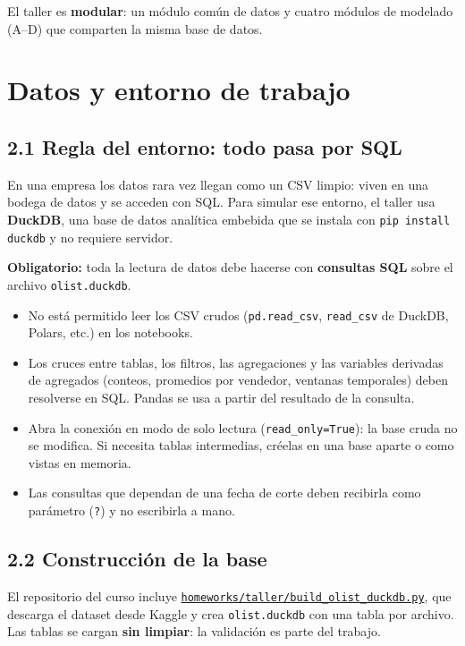 \documentclass[11pt,letterpaper]{article}
\newcommand{\buildscript}{https://github.com/anvasquezre/EAFIT_AA_2026-02/blob/main/homeworks/taller/build_olist_duckdb.py}
\begin{document}
El taller es \textbf{modular}: un módulo común de datos y cuatro módulos de modelado (A--D) que comparten la misma base de datos.

\section{Datos y entorno de trabajo}

\subsection*{2.1 Regla del entorno: todo pasa por SQL}
En una empresa los datos rara vez llegan como un CSV limpio: viven en una bodega de datos y se acceden con SQL. Para simular ese entorno, el taller usa \textbf{DuckDB}, una base de datos analítica embebida que se instala con \texttt{pip install duckdb} y no requiere servidor.

\begin{warnbox}
  {\color{eafitred}\bfseries Obligatorio:} toda la lectura de datos debe hacerse con \textbf{consultas SQL} sobre el archivo \texttt{olist.duckdb}.
  \begin{itemize}
    \item No está permitido leer los CSV crudos (\texttt{pd.read\_csv}, \texttt{read\_csv} de DuckDB, Polars, etc.) en los notebooks.
    \item Los cruces entre tablas, los filtros, las agregaciones y las variables derivadas de agregados (conteos, promedios por vendedor, ventanas temporales) deben resolverse en SQL. Pandas se usa a partir del resultado de la consulta.
    \item Abra la conexión en modo de solo lectura (\texttt{read\_only=True}): la base cruda no se modifica. Si necesita tablas intermedias, créelas en una base aparte o como vistas en memoria.
    \item Las consultas que dependan de una fecha de corte deben recibirla como parámetro (\texttt{?}) y no escribirla a mano.
  \end{itemize}
\end{warnbox}

\subsection*{2.2 Construcción de la base}
El repositorio del curso incluye \href{\buildscript}{\texttt{homeworks/taller/build\_olist\_duckdb.py}}, que descarga el dataset desde Kaggle y crea \texttt{olist.duckdb} con una tabla por archivo. Las tablas se cargan \textbf{sin limpiar}: la validación es parte del trabajo.
\end{document}

